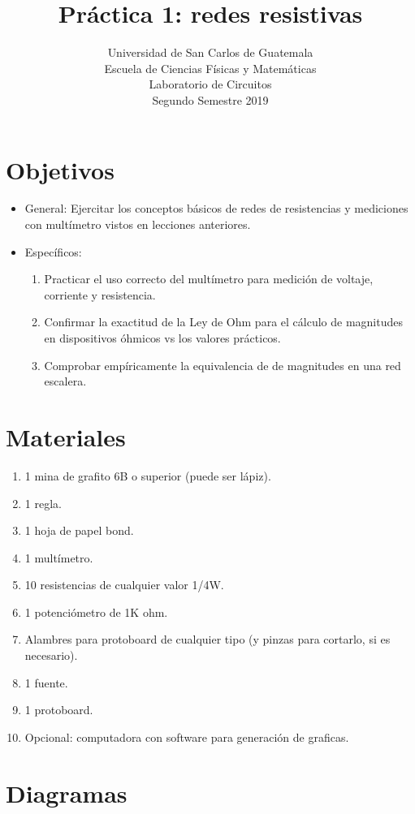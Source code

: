 \documentclass[letterpaper, 12 pt, conference]{ieeeconf}  %
\title{\LARGE \bf
Práctica 1: redes resistivas
}
\author{Universidad de San Carlos de Guatemala \\%
Escuela de Ciencias Físicas y Matemáticas\\
Laboratorio de Circuitos\\
Segundo Semestre 2019
}
\begin{document}
\maketitle
\thispagestyle{empty}
\pagestyle{empty}

\section{Objetivos}
\begin{itemize}
    \item General: Ejercitar los conceptos básicos de redes de resistencias y mediciones con multímetro vistos en lecciones anteriores.
    \item Específicos:
    \begin{enumerate}
    \item Practicar el uso correcto del multímetro para medición de voltaje, corriente y resistencia.
    \item Confirmar la exactitud de la Ley de Ohm para el cálculo de magnitudes en dispositivos óhmicos vs los valores prácticos.
    \item Comprobar empíricamente la equivalencia de de magnitudes en una red escalera.
\end{enumerate}
\end{itemize}


\section{Materiales}
\begin{enumerate}
    \item 1 mina de grafito 6B o superior (puede ser lápiz).
    \item 1 regla.
    \item 1 hoja de papel bond.
    \item 1 multímetro.
    \item 10 resistencias de cualquier valor 1/4W.
    \item 1 potenciómetro de 1K ohm.
    \item Alambres para protoboard de cualquier tipo (y pinzas para cortarlo, si es necesario).
    \item 1 fuente.
    \item 1 protoboard.
    \item Opcional: computadora con software para generación de graficas.
\end{enumerate}
\pagebreak

\section{Diagramas}
\end{document}
